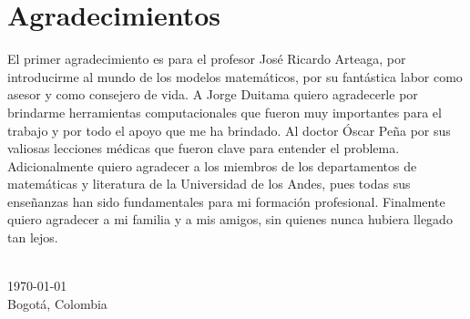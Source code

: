 \chapter*{Agradecimientos}
El primer agradecimiento es para el profesor José Ricardo Arteaga, por introducirme al mundo de los modelos matemáticos, por su fantástica labor como asesor y como consejero de vida. A Jorge Duitama quiero agradecerle por brindarme herramientas computacionales que fueron muy importantes para el trabajo y por todo el apoyo que me ha brindado. Al doctor Óscar Peña por sus valiosas lecciones médicas que fueron clave para entender el problema. Adicionalmente quiero agradecer a los miembros de los departamentos de matemáticas y literatura de la Universidad de los Andes, pues todas sus enseñanzas han sido fundamentales para mi formación profesional. Finalmente quiero agradecer a mi familia y a mis amigos, sin quienes nunca hubiera llegado tan lejos.   




{
\makeatletter
\vspace{1cm}
\raggedleft
\@author{}\\
\today{}\\
Bogotá, Colombia\\
\raggedright
\makeatother
}
